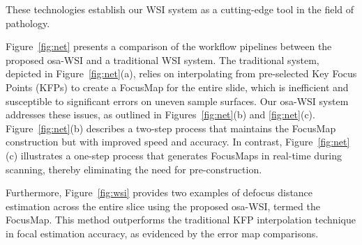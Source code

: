 These technologies establish our WSI system as a cutting-edge tool in the field of pathology.


Figure~\ref{fig:net} presents a comparison of the workflow pipelines between the proposed osa-WSI and a traditional WSI system. The traditional system, depicted in Figure~\ref{fig:net}(a), relies on interpolating from pre-selected Key Focus Points (KFPs) to create a FocusMap for the entire slide, which is inefficient and susceptible to significant errors on uneven sample surfaces. 
Our osa-WSI system addresses these issues, as outlined in Figures~\ref{fig:net}(b) and \ref{fig:net}(c). Figure~\ref{fig:net}(b) describes a two-step process that maintains the FocusMap construction but with improved speed and accuracy. In contrast, Figure~\ref{fig:net}(c) illustrates a one-step process that generates FocusMaps in real-time during scanning, thereby eliminating the need for pre-construction.


Furthermore, Figure~\ref{fig:wsi} provides two examples of defocus distance estimation across the entire slice using the proposed osa-WSI, termed the FocusMap. This method outperforms the traditional KFP interpolation technique in focal estimation accuracy, as evidenced by the error map comparisons.

